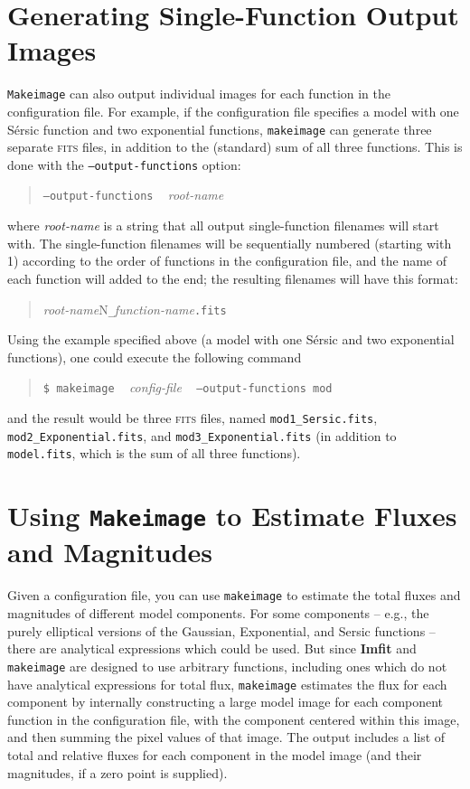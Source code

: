 \documentclass[10pt,a4paper,article]{memoir}
\newcommand{\imfit}{\textbf{Imfit}}
\newcommand{\makeimage}{\texttt{makeimage}}
\newcommand{\Makeimage}{\texttt{Makeimage}}
\begin{document}
\section{Generating Single-Function Output Images}

\Makeimage{} can also output individual images for each function
in the configuration file. For example, if the configuration file specifies
a model with one S\'ersic function and two exponential functions, \makeimage{}
can generate three separate \textsc{fits} files, in addition to the (standard) sum of
all three functions.  This is done with the \texttt{--output-functions} option:
\begin{quote}
  \texttt{--output-functions} ~ \textit{root-name}
\end{quote}
where \textit{root-name} is a string that all output single-function filenames will
start with. The single-function filenames will be sequentially numbered (starting
with 1) according to the order of functions in the configuration file, and the
name of each function will added to the end; the resulting filenames will have
this format:
\begin{quote}
  \textit{root-name}{N}\texttt{\_}\textit{function-name}\texttt{.fits}
\end{quote}

Using the example specified above (a model with one S\'ersic and two exponential
functions), one could execute the following command
\begin{quote}
  \texttt{\$ \makeimage} ~ \textit{config-file} ~ \texttt{--output-functions mod}
\end{quote}
and the result would be three \textsc{fits} files, named \texttt{mod1\_Sersic.fits},
\texttt{mod2\_Exponential.fits}, and \texttt{mod3\_Exponential.fits} (in addition
to \texttt{model.fits}, which is the sum of all three functions).


\section{Using \Makeimage{} to Estimate Fluxes and Magnitudes}

Given a configuration file, you can use \makeimage{} to estimate the total
fluxes and magnitudes of different model components. For some components --
e.g., the purely elliptical versions of the Gaussian, Exponential, and Sersic
functions -- there are analytical expressions which could be used. But since
\imfit{} and \makeimage{} are designed to use arbitrary functions, including
ones which do not have analytical expressions for total flux, \makeimage{}
estimates the flux for each component by internally constructing a large model
image for each component function in the configuration file, with the
component centered within this image, and then summing the pixel values of that image. The
output includes a list of total and relative fluxes for each component in the
model image (and their magnitudes, if a zero point is supplied).
\end{document}
